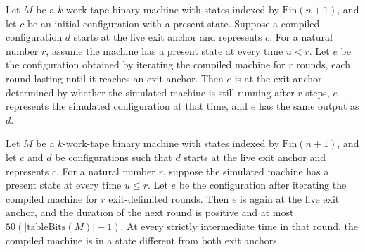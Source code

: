 \begin{lemma}
\label{Turing.StepBlock.loopOrbit_rep}
\leanok
{}
Let $M$ be a $k$-work-tape binary machine with states indexed by $\text{Fin}(n+1)$, and
let $c$ be an initial configuration with a present state. Suppose a compiled
configuration $d$ starts at the live exit anchor and represents $c$. For a natural
number $r$, assume the machine has a present state at every time $u<r$. Let $e$ be the
configuration obtained by iterating the compiled machine for $r$ rounds, each round
lasting until it reaches an exit anchor. Then $e$ is at the exit anchor determined by
whether the simulated machine is still running after $r$ steps, $e$ represents the
simulated configuration at that time, and $e$ has the same output as $d$.
\end{lemma}

\begin{lemma}
\label{Turing.StepBlock.loopOrbit_round}
\leanok
{}
Let $M$ be a $k$-work-tape binary machine with states indexed by $\text{Fin}(n+1)$, and
let $c$ and $d$ be configurations such that $d$ starts at the live exit anchor and
represents $c$. For a natural number $r$, suppose the simulated machine has a present
state at every time $u\le r$. Let $e$ be the configuration after
iterating the compiled machine for $r$ exit-delimited rounds. Then $e$ is again at the
live exit anchor, and the duration of the next round is positive and at most
$50(|\text{tableBits}(M)|+1)$. At every strictly intermediate time in that round, the
compiled machine is in a state different from both exit anchors.
\end{lemma}

